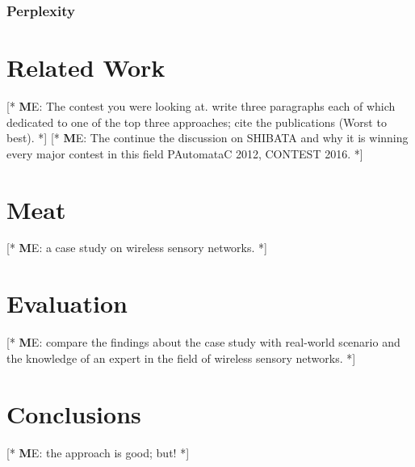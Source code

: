 \documentclass[
a4paper,
12pt
]{scrartcl}
\newcommand\me[1]{ [* {\textbf ME:} #1 *]}
\begin{document}
\subsubsection{Perplexity}
\newpage
\section{Related Work}
\me{The contest you were looking at. write three paragraphs each of which dedicated to one of the top three approaches; cite the publications (Worst to best).}
\me{The continue the discussion on SHIBATA and why it is winning every major contest in this field  PAutomataC 2012, CONTEST 2016.}

\section{Meat}
\me {a case study on wireless sensory networks.}



\newpage
\section{Evaluation}
\me {compare the findings about the case study with real-world scenario and the knowledge of an expert in the field of wireless sensory networks.}



\newpage
\section{Conclusions}
\me{the approach is good; but!}

\appendix
 
 
\end{document}
